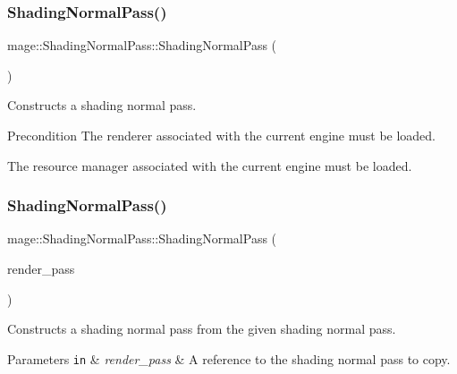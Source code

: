 \subsubsection{\texorpdfstring{Shading\+Normal\+Pass()}{ShadingNormalPass()}\hspace{0.1cm}{\footnotesize\ttfamily [1/3]}}
{\footnotesize\ttfamily mage\+::\+Shading\+Normal\+Pass\+::\+Shading\+Normal\+Pass (\begin{DoxyParamCaption}{ }\end{DoxyParamCaption})}

Constructs a shading normal pass.

\begin{DoxyPrecond}{Precondition}
The renderer associated with the current engine must be loaded. 

The resource manager associated with the current engine must be loaded. 
\end{DoxyPrecond}
\hypertarget{classmage_1_1_shading_normal_pass_ab13b45f9a3118f8494150d64ff06f94f}{}\label{classmage_1_1_shading_normal_pass_ab13b45f9a3118f8494150d64ff06f94f} 
\subsubsection{\texorpdfstring{Shading\+Normal\+Pass()}{ShadingNormalPass()}\hspace{0.1cm}{\footnotesize\ttfamily [2/3]}}
{\footnotesize\ttfamily mage\+::\+Shading\+Normal\+Pass\+::\+Shading\+Normal\+Pass (\begin{DoxyParamCaption}\item[{const \hyperlink{classmage_1_1_shading_normal_pass}{Shading\+Normal\+Pass} \&}]{render\+\_\+pass }\end{DoxyParamCaption})\hspace{0.3cm}{\ttfamily [delete]}}

Constructs a shading normal pass from the given shading normal pass.


\begin{DoxyParams}[1]{Parameters}
\mbox{\tt in}  & {\em render\+\_\+pass} & A reference to the shading normal pass to copy. \\
\hline
\end{DoxyParams}
\hypertarget{classmage_1_1_shading_normal_pass_acc466f246daaf57ccace5aa8782f0799}{}\label{classmage_1_1_shading_normal_pass_acc466f246daaf57ccace5aa8782f0799} 
